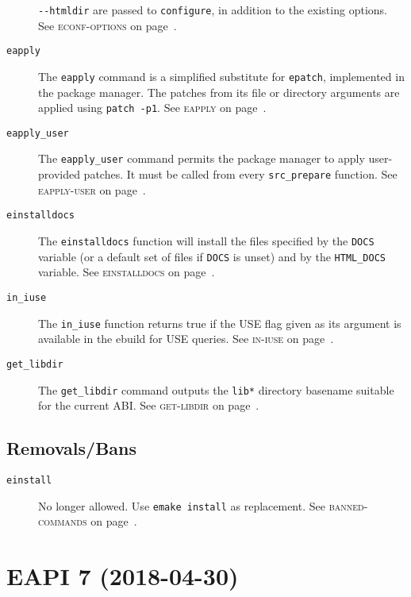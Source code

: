 \documentclass[a4paper,nofoldmark]{leaflet}
\newcommand{\code}[1]{\texttt{#1}}
\newcommand{\featureref}[1]{\textsc{#1} on page~\pageref{feat:#1}}
\begin{document}
\begin{description}
    \code{-{}-htmldir} are passed to \code{configure}, in addition to
    the existing options.
    See \featureref{econf-options}.
    \item[\code{eapply}] The \code{eapply} command is a simplified
    substitute for \code{epatch}, implemented in the package manager.
    The patches from its file or directory arguments are applied using
    \code{patch -p1}.
    See \featureref{eapply}.
    \item[\code{eapply_user}] The \code{eapply_user} command permits
    the package manager to apply user-provided patches. It must be
    called from every \code{src_prepare} function.
    See \featureref{eapply-user}.
    \item[\code{einstalldocs}] The \code{einstalldocs} function will
    install the files specified by the \code{DOCS} variable (or a
    default set of files if \code{DOCS} is unset) and by the
    \code{HTML_DOCS} variable.
    See \featureref{einstalldocs}.
    \item[\code{in_iuse}] The \code{in_iuse} function returns
    true if the USE flag given as its argument is available in the
    ebuild for USE queries.
    See \featureref{in-iuse}.
    \item[\code{get_libdir}] The \code{get_libdir} command outputs
    the \code{lib*} directory basename suitable for the current ABI\@.
    See \featureref{get-libdir}.
\end{description}
\subsection{Removals/Bans}
\label{sec:cs:eapi6-removalsbans}
\begin{description}
    \item[\code{einstall}] No longer allowed. Use \code{emake install}
    as replacement.
    See \featureref{banned-commands}.
\end{description}

\section{EAPI 7 (2018-04-30)}
\label{sec:cs:eapi7}
\end{document}
